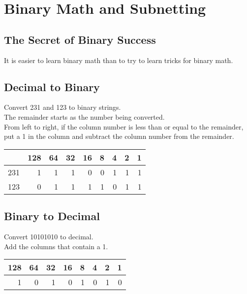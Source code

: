 \section{Binary Math and Subnetting}

\subsection{The Secret of Binary Success}

It is easier to learn binary math than to try to learn tricks for binary math.

\subsection{Decimal to Binary}

Convert 231 and 123 to binary strings.\\

The remainder starts as the number being converted.\\

From left to right, if the column number is less than or equal to the
remainder, put a 1 in the column and subtract the column number from the
remainder.\\

\begin{tabular}{ | r | r | r | r | r | r | r | r | r | }
\hline
    & 128 & 64 & 32 & 16 & 8 & 4 & 2 & 1 \\ \hline
231 &   1 &  1 &  1 &  0 & 0 & 1 & 1 & 1 \\ \hline
123 &   0 &  1 &  1 &  1 & 1 & 0 & 1 & 1 \\ \hline
\end{tabular}

\subsection{Binary to Decimal}

Convert 10101010 to decimal.\\

Add the columns that contain a 1.\\

\begin{tabular}{ | r | r | r | r | r | r | r | r | }
\hline
128 & 64 & 32 & 16 & 8 & 4 & 2 & 1 \\ \hline
  1 &  0 &  1 &  0 & 1 & 0 & 1 & 0 \\ \hline
\end{tabular}

